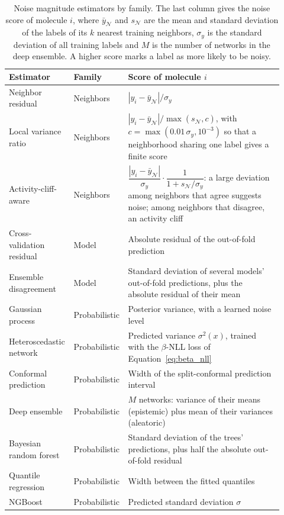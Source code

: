 \begin{table}[htbp]
\centering
\small
\begin{adjustbox}{max width=\textwidth,max totalheight=0.78\textheight}
\begin{tabular}{@{}P{0.2\linewidth}P{0.15\linewidth}P{0.57\linewidth}@{}}
\toprule
Estimator & Family & Score of molecule $i$ \\
\midrule
Neighbor residual & Neighbors & $|y_i - \bar y_{\mathcal{N}}| / \sigma_y$ \\
Local variance ratio & Neighbors & $|y_i - \bar y_{\mathcal{N}}| / \max(s_{\mathcal{N}}, c)$, with $c = \max(0.01\,\sigma_y, 10^{-3})$ so that a neighborhood sharing one label gives a finite score \\
Activity-cliff-aware & Neighbors & $\dfrac{|y_i - \bar y_{\mathcal{N}}|}{\sigma_y} \cdot \dfrac{1}{1 + s_{\mathcal{N}}/\sigma_y}$: a large deviation among neighbors that agree suggests noise; among neighbors that disagree, an activity cliff \citep{Dablander2023} \\
Cross-validation residual & Model & Absolute residual of the out-of-fold prediction \\
Ensemble disagreement & Model & Standard deviation of several models' out-of-fold predictions, plus the absolute residual of their mean \\
Gaussian process & Probabilistic & Posterior variance, with a learned noise level \citep{gauche} \\
Heteroscedastic network & Probabilistic & Predicted variance $\sigma^2(x)$, trained with the $\beta$-NLL loss of Equation~\ref{eq:beta_nll} \citep{Seitzer2022} \\
Conformal prediction & Probabilistic & Width of the split-conformal prediction interval \citep{Shafer2008} \\
Deep ensemble & Probabilistic & $M$ networks: variance of their means (epistemic) plus mean of their variances (aleatoric) \citep{lakshminarayanan2017} \\
Bayesian random forest & Probabilistic & Standard deviation of the trees' predictions, plus half the absolute out-of-fold residual \citep{taddy2015} \\
Quantile regression & Probabilistic & Width between the fitted quantiles \\
NGBoost & Probabilistic & Predicted standard deviation $\sigma$ \citep{Duan2020} \\
\bottomrule
\end{tabular}
\end{adjustbox}
\caption[Noise magnitude estimators.]{Noise magnitude estimators by family. The last column gives the noise score of molecule $i$, where $\bar y_{\mathcal{N}}$ and $s_{\mathcal{N}}$ are the mean and standard deviation of the labels of its $k$ nearest training neighbors, $\sigma_y$ is the standard deviation of all training labels and $M$ is the number of networks in the deep ensemble. A higher score marks a label as more likely to be noisy.}
\label{tab:noise_estimators}
\end{table}


